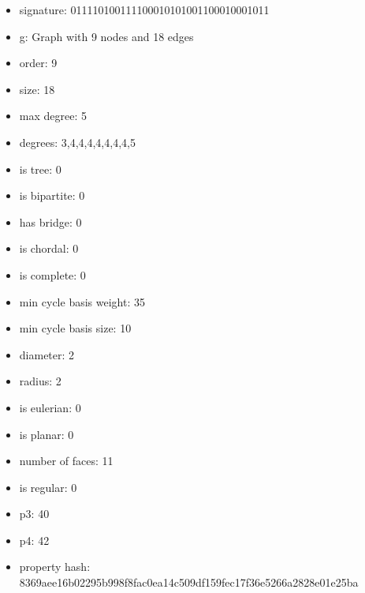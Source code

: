\newpage
\begin{figure}
\end{figure}
\begin{itemize}
\item signature: 011110100111100010101001100010001011
\item g: Graph with 9 nodes and 18 edges
\item order: 9
\item size: 18
\item max degree: 5
\item degrees: 3,4,4,4,4,4,4,4,5
\item is tree: 0
\item is bipartite: 0
\item has bridge: 0
\item is chordal: 0
\item is complete: 0
\item min cycle basis weight: 35
\item min cycle basis size: 10
\item diameter: 2
\item radius: 2
\item is eulerian: 0
\item is planar: 0
\item number of faces: 11
\item is regular: 0
\item p3: 40
\item p4: 42
\item property hash: 8369aee16b02295b998f8fac0ea14c509df159fec17f36e5266a2828e01e25ba
\end{itemize}
